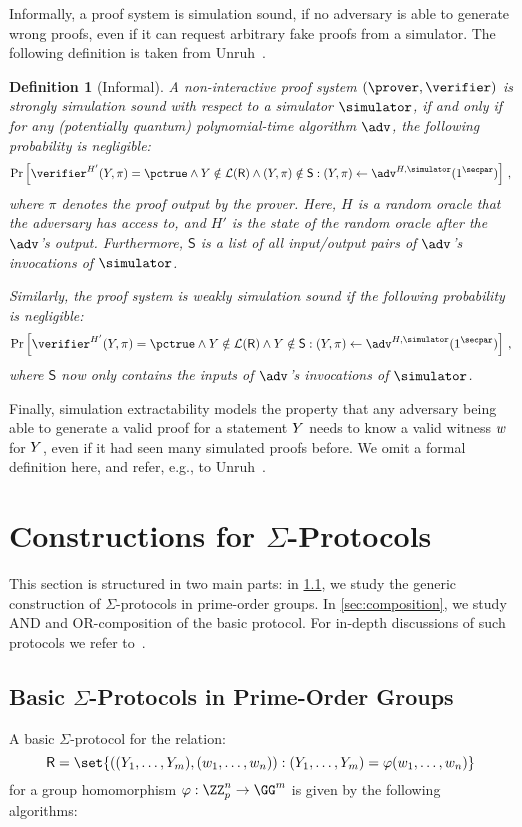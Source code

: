 \documentclass[runningheads,11pt]{article}
\newtheorem{definition}{Definition}
\begin{document}
Informally, a proof system is simulation sound, if no adversary is able to generate wrong proofs, even if it can request arbitrary fake proofs from a simulator.
The following definition is taken from Unruh~\cite{AC:Unruh17}.
\begin{definition}[Informal]
  A non-interactive proof system $(\prover,\verifier)$ is \emph{strongly simulation sound} with respect to a simulator $\simulator$, if and only if for any (potentially quantum) polynomial-time algorithm $\adv$, the following probability is negligible:
  $$
    \Pr\left[\verifier^{H'}(\statement,\pi)=\accept\land\statement\notin\lang(\relation)\land(\statement,\pi)\notin\mathsf{S} : (\statement,\pi)\gets\adv^{H,\simulator}(1^\secpar) \right]\,,
  $$
  where $\pi$ denotes the proof output by the prover.
  Here, $H$ is a random oracle that the adversary has access to, and $H'$ is the state of the random oracle after the $\adv$'s output.
  Furthermore, $\mathsf{S}$ is a list of all input/output pairs of $\adv$'s invocations of $\simulator$.

  Similarly, the proof system is \emph{weakly simulation sound} if the following probability is negligible:
  $$
    \Pr\left[\verifier^{H'}(\statement,\pi)=\accept\land\statement\notin\lang(\relation)\land\statement\notin\mathsf{S} : (\statement,\pi)\gets\adv^{H,\simulator}(1^\secpar) \right]\,,
  $$
  where $\mathsf{S}$ now only contains the inputs of $\adv$'s invocations of $\simulator$.
\end{definition}

Finally, simulation extractability models the property that any adversary being able to generate a valid proof for a statement $Y$ needs to know a valid witness $w$ for $Y$, even if it had seen many simulated proofs before.
We omit a formal definition here, and refer, e.g., to Unruh~\cite{AC:Unruh17}.


\section{Constructions for $\Sigma$-Protocols}

This section is structured in two main parts: in \cref{sec:basicsigma}, we study the generic construction of $\Sigma$-protocols in prime-order groups. In \cref{sec:composition}, we study AND and OR-composition of the basic protocol.
For in-depth discussions of such protocols we refer to~\cite{bangerter05,AFRICACRYPT:Maurer09,DBLP:journals/dcc/Maurer15}.
\subsection{Basic $\Sigma$-Protocols in Prime-Order Groups}\label{sec:basicsigma}
A basic $\Sigma$-protocol for the relation:
\[
  \relation=\set{((\statement_1,\dots,\statement_m),(w_1,\dots,w_n)) : (\statement_1,\dots,\statement_m)=\varphi(w_1,\dots,w_n)}
\]
 for a group homomorphism $\varphi:\ZZ_p^n\to\GG^m$ is given by the following algorithms:
\end{document}
